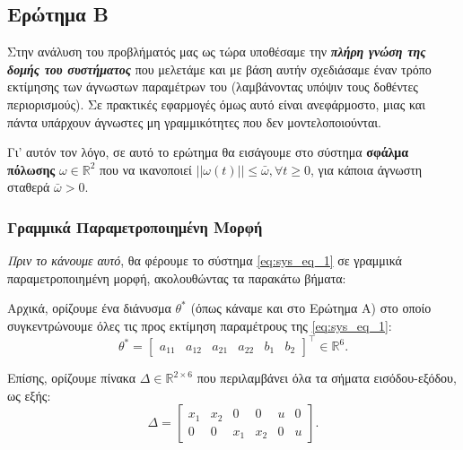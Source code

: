 \documentclass[12pt]{article} %
\numberwithin{equation}{section}  %
\begin{document}
\newpage

\subsection{Ερώτημα Β}

Στην ανάλυση του προβλήματός μας ως τώρα υποθέσαμε την \textit{\textbf{πλήρη γνώση της δομής του συστήματος}} που μελετάμε 
και με βάση αυτήν σχεδιάσαμε έναν τρόπο εκτίμησης των άγνωστων παραμέτρων του (λαμβάνοντας υπόψιν τους δοθέντες περιορισμούς). 
Σε πρακτικές εφαρμογές όμως αυτό είναι ανεφάρμοστο, μιας και πάντα υπάρχουν άγνωστες μη γραμμικότητες που δεν μοντελοποιούνται. 

Γι' αυτόν τον λόγο, σε αυτό το ερώτημα θα εισάγουμε στο σύστημα \textbf{σφάλμα πόλωσης} $\omega \in \mathbb{R}^2$ 
που να ικανοποιεί $||\omega(t)|| \le \bar{\omega}, \forall t \ge 0$, για κάποια άγνωστη σταθερά $\bar{\omega} > 0$.

\subsubsection{Γραμμικά Παραμετροποιημένη Μορφή}

\textit{Πριν το κάνουμε αυτό}, θα φέρουμε το σύστημα \eqref{eq:sys_eq_1} σε γραμμικά παραμετροποιημένη μορφή, ακολουθώντας τα παρακάτω βήματα:

\noindent\textbullet\hspace{0.2em} Αρχικά, ορίζουμε ένα διάνυσμα $\theta^*$ (όπως κάναμε και στο Ερώτημα Α) στο οποίο συγκεντρώνουμε όλες τις προς εκτίμηση παραμέτρους της \eqref{eq:sys_eq_1}:
\vspace{-\topsep}
\vspace{+2pt}
\begin{equation}
   \theta^* = \begin{bmatrix} a_{11} & a_{12} & a_{21} & a_{22} & b_{1} & b_{2} \end{bmatrix}^\top \in \mathbb{R}^6. 
\end{equation}

\noindent Επίσης, ορίζουμε πίνακα $\Delta \in \mathbb{R}^{2 \times 6}$ που περιλαμβάνει όλα τα σήματα εισόδου-εξόδου, ως εξής:
\begin{equation}
\Delta = \begin{bmatrix}
    x_1 & x_2 & 0   & 0   & u & 0 \\
    0   & 0   & x_1 & x_2 & 0 & u
\end{bmatrix}.
\end{equation}
\end{document}
